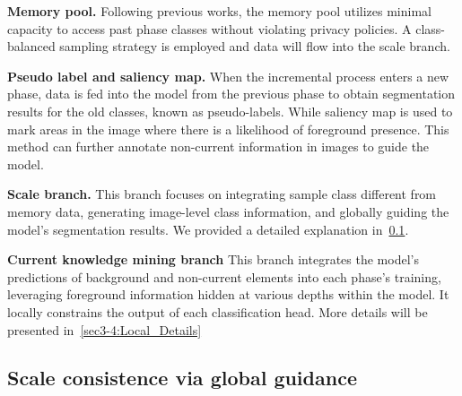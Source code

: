 

\textbf{Memory pool.}
Following previous works, the memory pool utilizes minimal capacity to access past phase classes without violating privacy policies. A class-balanced sampling strategy is employed and data will flow into the scale branch.

\textbf{Pseudo label and saliency map.}
When the incremental process enters a new phase, data is fed into the model from the previous phase to obtain segmentation results for the old classes, known as pseudo-labels. While saliency map is used to mark areas in the image where there is a likelihood of foreground presence. This method can further annotate non-current information in images to guide the model.

\textbf{Scale branch.}
This branch focuses on integrating sample class different from memory data, generating image-level class information, and globally guiding the model's segmentation results. We provided a detailed explanation in~\cref{sec3-3:Global_Insights}.


\textbf{Current knowledge mining branch}
This branch integrates the model's predictions of background and non-current elements into each phase's training, leveraging foreground information hidden at various depths within the model. It locally constrains the output of each classification head. More details will be presented in~\cref{sec3-4:Local_Details}

\subsection{Scale consistence via global guidance}
\label{sec3-3:Global_Insights}



